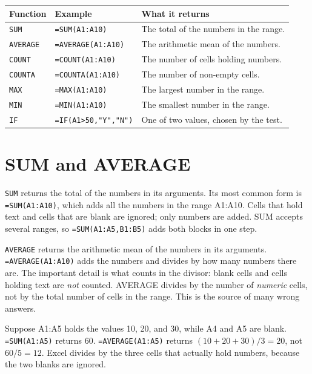 \begin{center}
\begin{tabular}{p{}p{}p{}}
\toprule
\textbf{Function} & \textbf{Example} & \textbf{What it returns} \\
\midrule
\texttt{SUM} & \texttt{=SUM(A1:A10)} & The total of the numbers in the range. \\
\texttt{AVERAGE} & \texttt{=AVERAGE(A1:A10)} & The arithmetic mean of the numbers. \\
\texttt{COUNT} & \texttt{=COUNT(A1:A10)} & The number of cells holding numbers. \\
\texttt{COUNTA} & \texttt{=COUNTA(A1:A10)} & The number of non-empty cells. \\
\texttt{MAX} & \texttt{=MAX(A1:A10)} & The largest number in the range. \\
\texttt{MIN} & \texttt{=MIN(A1:A10)} & The smallest number in the range. \\
\texttt{IF} & \texttt{=IF(A1>50,"Y","N")} & One of two values, chosen by the test. \\
\bottomrule
\end{tabular}
\end{center}

\section{SUM and AVERAGE}
\texttt{SUM} returns the total of the numbers in its arguments. Its most
common form is \texttt{=SUM(A1:A10)}, which adds all the numbers in the range
A1:A10. Cells that hold text and cells that are blank are ignored; only
numbers are added. SUM accepts several ranges, so \texttt{=SUM(A1:A5,B1:B5)}
adds both blocks in one step.

\texttt{AVERAGE} returns the arithmetic mean of the numbers in its arguments.
\texttt{=AVERAGE(A1:A10)} adds the numbers and divides by how many numbers
there are. The important detail is what counts in the divisor: blank cells and
cells holding text are \emph{not} counted. AVERAGE divides by the number of
\emph{numeric} cells, not by the total number of cells in the range. This is
the source of many wrong answers.

\begin{example}
Suppose A1:A5 holds the values 10, 20, and 30, while A4 and A5 are blank.
\texttt{=SUM(A1:A5)} returns $60$. \texttt{=AVERAGE(A1:A5)} returns
$(10+20+30)/3 = 20$, not $60/5 = 12$. Excel divides by the three cells that
actually hold numbers, because the two blanks are ignored.
\end{example}

